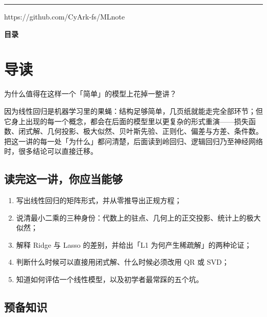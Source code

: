 \documentclass[11pt,a4paper,fontset=windows,zihao=-4]{ctexart}
\makeatletter
\renewcommand{\tableofcontents}{%
  \par\begingroup
    \sffamily\Large\bfseries\color{navy}目\quad 录\par
  \endgroup
  \vspace{1.0em}
  \small
  \@starttoc{toc}%
}
\makeatother
\begin{document}
\begin{titlepage}
\vspace{3.55cm}
{\color{navy!30}\rule{3.0cm}{0.4pt}\par}
\vspace{0.32cm}
{\color{grey}\footnotesize https://github.com/CyArk-fs/MLnote\par}
\end{titlepage}

\setcounter{page}{1}

\tableofcontents
\thispagestyle{plain}
\clearpage

\setcounter{page}{1}

\section*{导\quad 读}

为什么值得在这样一个「简单」的模型上花掉一整讲？

因为线性回归是机器学习里的果蝇：结构足够简单，几页纸就能走完全部环节；但它身上出现的每一个概念，都会在后面的模型里以更复杂的形式重演——损失函数、闭式解、几何投影、极大似然、贝叶斯先验、正则化、偏差与方差、条件数。把这一讲的每一处「为什么」都问清楚，后面读到岭回归、逻辑回归乃至神经网络时，很多结论可以直接迁移。

\subsection*{读完这一讲，你应当能够}

\begin{enumerate}[label=\textcolor{navy}{\bfseries\arabic*.},leftmargin=2.2em]
  \item 写出线性回归的矩阵形式，并从零推导出正规方程；
  \item 说清最小二乘的三种身份：代数上的驻点、几何上的正交投影、统计上的极大似然；
  \item 解释 Ridge 与 Lasso 的差别，并给出「L1 为何产生稀疏解」的两种论证；
  \item 判断什么时候可以直接用闭式解、什么时候必须改用 QR 或 SVD；
  \item 知道如何评估一个线性模型，以及初学者最常踩的五个坑。
\end{enumerate}

\subsection*{预备知识}
\end{document}
